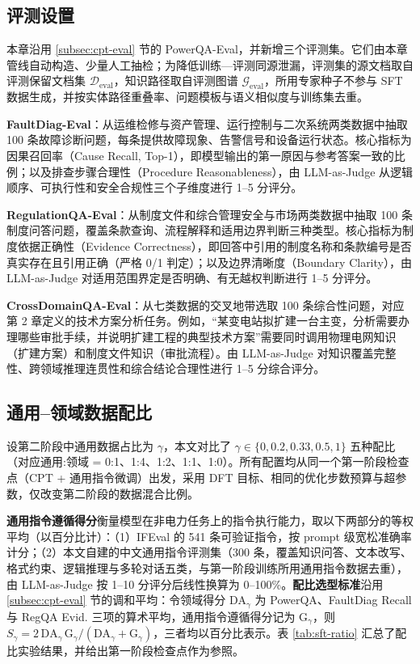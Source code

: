 \documentclass[fontset=fandol,type=master,campus=shenzhen,etitleauto=true]{hithesisbook}
\begin{document}
\subsection{评测设置}\label{subsec:sft-eval}

本章沿用 \ref{subsec:cpt-eval} 节的 PowerQA-Eval，并新增三个评测集。它们由本章管线自动构造、少量人工抽检；为降低训练—评测同源泄漏，评测集的源文档取自评测保留文档集 $\mathcal{D}_{\text{eval}}$，知识路径取自评测图谱 $\mathcal{G}_{\text{eval}}$，所用专家种子不参与 SFT 数据生成，并按实体路径重叠率、问题模板与语义相似度与训练集去重。

\textbf{FaultDiag-Eval}：从运维检修与资产管理、运行控制与二次系统两类数据中抽取 100 条故障诊断问题，每条提供故障现象、告警信号和设备运行状态。核心指标为因果召回率（Cause Recall, Top-1），即模型输出的第一原因与参考答案一致的比例；以及排查步骤合理性（Procedure Reasonableness），由 LLM-as-Judge 从逻辑顺序、可执行性和安全合规性三个子维度进行 1--5 分评分。

\textbf{RegulationQA-Eval}：从制度文件和综合管理安全与市场两类数据中抽取 100 条制度问答问题，覆盖条款查询、流程解释和适用边界判断三种类型。核心指标为制度依据正确性（Evidence Correctness），即回答中引用的制度名称和条款编号是否真实存在且引用正确（严格 0/1 判定）；以及边界清晰度（Boundary Clarity），由 LLM-as-Judge 对适用范围界定是否明确、有无越权判断进行 1--5 分评分。

\textbf{CrossDomainQA-Eval}：从七类数据的交叉地带选取 100 条综合性问题，对应第 2 章定义的技术方案分析任务。例如，“某变电站拟扩建一台主变，分析需要办理哪些审批手续，并说明扩建工程的典型技术方案”需要同时调用物理电网知识（扩建方案）和制度文件知识（审批流程）。由 LLM-as-Judge 对知识覆盖完整性、跨领域推理连贯性和综合结论合理性进行 1--5 分综合评分。
\subsection{通用--领域数据配比}\label{subsec:sft-ratio}

设第二阶段中通用数据占比为 $\gamma$，本文对比了 $\gamma \in \{0, 0.2, 0.33, 0.5, 1\}$ 五种配比（对应通用:领域 = 0:1、1:4、1:2、1:1、1:0）。所有配置均从同一个第一阶段检查点（CPT + 通用指令微调）出发，采用 DFT 目标、相同的优化步数预算与超参数，仅改变第二阶段的数据混合比例。

\textbf{通用指令遵循得分}衡量模型在非电力任务上的指令执行能力，取以下两部分的等权平均（以百分比计）：（1）IFEval\cite{ref85} 的 541 条可验证指令，按 prompt 级宽松准确率计分；（2）本文自建的中文通用指令评测集（300 条，覆盖知识问答、文本改写、格式约束、逻辑推理与多轮对话五类，与第一阶段训练所用通用指令数据去重），由 LLM-as-Judge 按 1--10 分评分后线性换算为 0--100\%。\textbf{配比选型标准}沿用 \ref{subsec:cpt-eval} 节的调和平均：令领域得分 $\text{DA}_\gamma$ 为 PowerQA、FaultDiag Recall 与 RegQA Evid. 三项的算术平均，通用指令遵循得分记为 $\text{G}_\gamma$，则 $S_\gamma = 2\,\text{DA}_\gamma\,\text{G}_\gamma / (\text{DA}_\gamma + \text{G}_\gamma)$，三者均以百分比表示。表 \ref{tab:sft-ratio} 汇总了配比实验结果，并给出第一阶段检查点作为参照。
\end{document}
